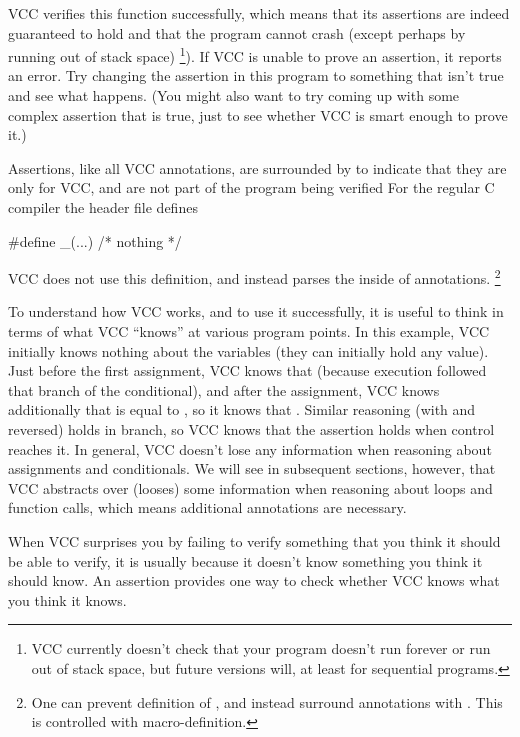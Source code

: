 VCC verifies this function successfully, which means that its
assertions are indeed guaranteed to hold and that the program cannot
crash (except perhaps by running out of stack space)%
\footnote{
  VCC currently doesn't check that your program doesn't run forever or
  run out of stack space, but future versions will, at least for sequential
  programs.  
}). If VCC is unable
to prove an assertion, it reports an error.  Try changing the
assertion in this program to something that isn't true and see what
happens. (You might also want to try coming up with some complex
assertion that is true, just to see whether VCC is smart enough to
prove it.)

Assertions, like all VCC annotations, 
are surrounded by  to indicate that they are
only for VCC, and are not part of the program being verified
For the regular C compiler the  header file defines
\begin{VCC}
#define _(...) /* nothing */
\end{VCC}
VCC does not use this definition, and instead parses the inside of 
annotations.%
\footnote{
  One can prevent definition of \vcc{_}, and instead surround annotations with
  .
  This is controlled with  macro-definition.}

To understand how VCC works, and to use it successfully, it is useful to
think in terms of what VCC ``knows'' at various program points. In
this example, VCC initially knows nothing about the variables (they
can initially hold any value). Just before the first assignment, VCC knows that 
 (because execution followed that branch of the conditional), and
after the assignment, VCC knows additionally that  is equal to
, so it knows that . Similar reasoning
(with  and  reversed) holds in  branch, so VCC
knows that the assertion holds when control reaches it. In general,
VCC doesn't lose any information when reasoning about assignments and
conditionals. We will see in subsequent sections, however, that VCC
abstracts over (looses) some information when reasoning about loops and function calls,
which means additional annotations are necessary.

When VCC surprises you by failing to verify something that you think
it should be able to verify, it is usually because it doesn't know
something you think it should know. An assertion provides one way to
check whether VCC knows what you think it knows.


